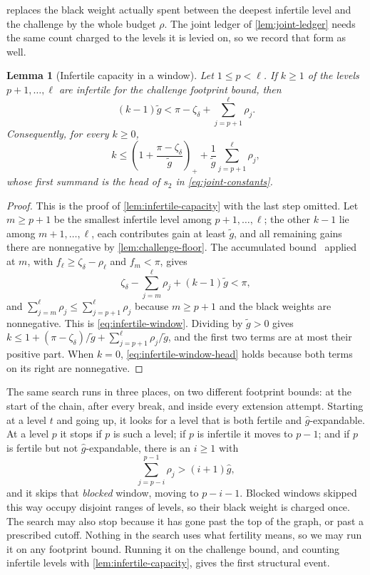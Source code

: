 \documentclass[11pt]{article}
\theoremstyle{plain}
\newtheorem{lemma}{Lemma}
\theoremstyle{remark}
\newcommand{\ghat}{\widehat g}
\newcommand{\gtilde}{\widetilde g}
\newcommand{\spend}[2]{\sum_{j=#1}^{#2}\rho_j}
\begin{document}
 replaces the black weight actually spent between the
deepest infertile level and the challenge by the whole budget \(\rho\).  The joint
ledger of \cref{lem:joint-ledger} needs the same count charged to the levels it is
levied on, so we record that form as well.

\begin{lemma}[Infertile capacity in a window]
\label{lem:infertile-window}
Let \(1\le p<\ell\).  If \(k\ge1\) of the levels \(p+1,\ldots,\ell\) are
infertile for the challenge footprint bound, then
\begin{equation}
 (k-1)\gtilde<\pi-\zeta_\delta+\spend{p+1}{\ell} .
 \label{eq:infertile-window}
\end{equation}
Consequently, for every \(k\ge0\),
\begin{equation}
 k\le\left(1+\frac{\pi-\zeta_\delta}{\gtilde}\right)_{\!+}
   +\frac{1}{\gtilde}\spend{p+1}{\ell},
 \label{eq:infertile-window-head}
\end{equation}
whose first summand is the head of \(s_2\) in \eqref{eq:joint-constants}.
\end{lemma}

\begin{proof}
This is the proof of \cref{lem:infertile-capacity} with the last step omitted.  Let
\(m\ge p+1\) be the smallest infertile level among \(p+1,\ldots,\ell\); the other
\(k-1\) lie among \(m+1,\ldots,\ell\), each contributes gain at least \(\gtilde\),
and all remaining gains there are nonnegative by \cref{lem:challenge-floor}.  The
accumulated bound~\cite[Claim 3]{FOCS:Reyzin24} applied at \(m\), with
\(f_\ell\ge\zeta_\delta-\rho_\ell\) and \(f_m<\pi\), gives
\[
 \zeta_\delta-\spend{m}{\ell}+(k-1)\gtilde<\pi ,
\]
and \(\spend{m}{\ell}\le\spend{p+1}{\ell}\) because \(m\ge p+1\) and the black
weights are nonnegative.  This is \eqref{eq:infertile-window}.  Dividing by
\(\gtilde>0\) gives
\(k\le1+(\pi-\zeta_\delta)/\gtilde+\spend{p+1}{\ell}/\gtilde\), and the first two
terms are at most their positive part.  When \(k=0\),
\eqref{eq:infertile-window-head} holds because both terms on its right are
nonnegative.
\end{proof}

The same search runs in three places, on two different footprint bounds: at the start
of the chain, after every break, and inside every extension attempt.  Starting at a
level \(t\) and going up, it looks for a level that is both fertile and
\(\ghat\)-expandable.  At a level \(p\) it stops if \(p\) is such a level; if \(p\) is
infertile it moves to \(p-1\); and if \(p\) is fertile but not \(\ghat\)-expandable,
there is an \(i\ge1\) with
\[
 \spend{p-i}{p-1}>(i+1)\ghat,
\]
and it skips that \emph{blocked} window, moving to \(p-i-1\).  Blocked windows
skipped this way occupy disjoint ranges of levels, so their black weight is charged
once.  The search may also stop because it has gone past the top of the graph, or past
a prescribed cutoff.  Nothing in the search uses what fertility means, so we may run it
on any footprint bound.  Running it on the challenge bound, and counting infertile
levels with \cref{lem:infertile-capacity}, gives the first structural event.
\end{document}
